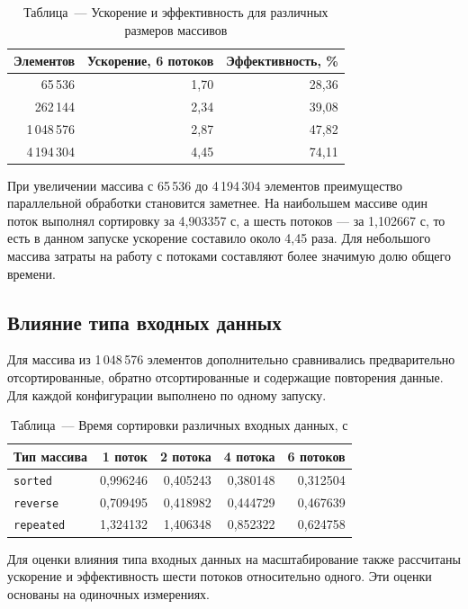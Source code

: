 \documentclass[12pt,a4paper]{article}
\begin{document}
\begin{table}[H]
\centering\small
\renewcommand{\arraystretch}{1.22}
\begin{tabular}{r r r}
\toprule
\textbf{Элементов} & \textbf{Ускорение, 6 потоков} & \textbf{Эффективность, \%} \\
\midrule
65\,536 & 1,70 & 28,36 \\
262\,144 & 2,34 & 39,08 \\
1\,048\,576 & 2,87 & 47,82 \\
4\,194\,304 & 4,45 & 74,11 \\
\bottomrule
\end{tabular}
\caption*{Таблица~--- Ускорение и эффективность для различных размеров массивов}
\end{table}

При увеличении массива с 65\,536 до 4\,194\,304 элементов преимущество параллельной обработки становится заметнее. На наибольшем массиве один поток выполнял сортировку за 4,903357 с, а шесть потоков --- за 1,102667 с, то есть в данном запуске ускорение составило около 4,45 раза. Для небольшого массива затраты на работу с потоками составляют более значимую долю общего времени.

\subsection{Влияние типа входных данных}
Для массива из 1\,048\,576 элементов дополнительно сравнивались предварительно отсортированные, обратно отсортированные и содержащие повторения данные. Для каждой конфигурации выполнено по одному запуску.

\begin{table}[H]
\centering\small
\renewcommand{\arraystretch}{1.22}
\begin{tabular}{l r r r r}
\toprule
\textbf{Тип массива} & \textbf{1 поток} & \textbf{2 потока} & \textbf{4 потока} & \textbf{6 потоков} \\
\midrule
\texttt{sorted} & 0,996246 & 0,405243 & 0,380148 & 0,312504 \\
\texttt{reverse} & 0,709495 & 0,418982 & 0,444729 & 0,467639 \\
\texttt{repeated} & 1,324132 & 1,406348 & 0,852322 & 0,624758 \\
\bottomrule
\end{tabular}
\caption*{Таблица~--- Время сортировки различных входных данных, с}
\end{table}

Для оценки влияния типа входных данных на масштабирование также рассчитаны ускорение и эффективность шести потоков относительно одного. Эти оценки основаны на одиночных измерениях.
\end{document}

